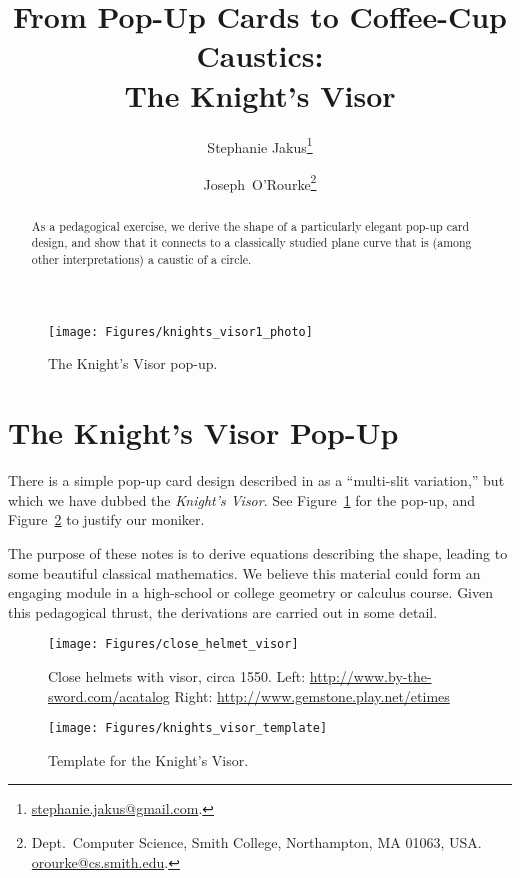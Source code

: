 \pdfoutput=1  \documentclass[]{article}
\title{From Pop-Up Cards to Coffee-Cup Caustics:\\
The Knight's Visor}
\author{Stephanie Jakus\thanks{
\protect\url{stephanie.jakus@gmail.com}.
}
\and 
Joseph~O'Rourke\thanks{
Dept.\ Computer Science, Smith College, Northampton,
MA 01063, USA.
\protect\url{orourke@cs.smith.edu}.
}
}
\newcommand{\figlab}[1]{\label{fig:#1}}
\newcommand{\seclab}[1]{\label{sec:#1}}
\newcommand{\figref}[1]{\ref{fig:#1}}
\begin{document}
\maketitle
\let\realfootnote=\footnote
\def\footnote#1{}
\tableofcontents
\let\footnote=\realfootnote

\begin{abstract}
As a pedagogical exercise, we derive the shape of a particularly elegant pop-up card design,
and show that it connects to a classically studied plane curve that is (among other
interpretations) a caustic of a circle.
\end{abstract}


\newpage
{}






\begin{figure}[htbp]
\centering
\texttt{[image: Figures/knights\_visor1\_photo]}
\caption{The Knight's Visor pop-up.}
\figlab{knights.visor.photo}
\end{figure}


\section{The Knight's Visor Pop-Up}
\seclab{Knights.Visor}
There is a simple pop-up card design described  in
\cite[p.~62, Figure~III]{j-tpub-93}  as a ``multi-slit variation,''
but which we have dubbed the \emph{Knight's Visor}.
See Figure~\figref{knights.visor.photo} for the pop-up,
and
Figure~\figref{knights.visors} to justify our moniker.

The purpose of these notes is to derive equations describing the shape,
leading to some beautiful classical mathematics.
We believe this material could form an engaging module in a high-school or college geometry
or calculus course.
Given this pedagogical thrust, the derivations are carried out in some detail.
\begin{figure}[htbp]
\centering
\texttt{[image: Figures/close\_helmet\_visor]}
\caption{Close helmets with visor, circa 1550.
Left:
\protect\url{http://www.by-the-sword.com/acatalog}
Right: 
\protect\url{http://www.gemstone.play.net/etimes}
}
\figlab{knights.visors}
\end{figure}



\begin{figure}[htbp]
\centering
\texttt{[image: Figures/knights\_visor\_template]}
\caption{Template for the Knight's Visor.}
\figlab{knights.visor.template}
\end{figure}
\end{document}
